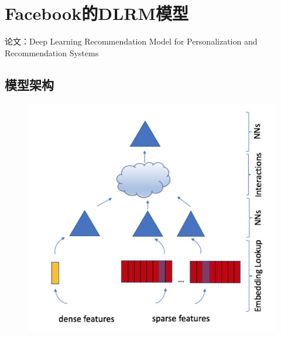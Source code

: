 \documentclass[12pt]{article}
\begin{document}
\section{Facebook的DLRM模型}
论文：Deep Learning Recommendation Model for Personalization and Recommendation Systems

\subsection{模型架构}
\begin{figure}[H]
    \centering
    \includegraphics[width=.6\textwidth]{fig/Facebook_DLRM_Structure.jpg}
\end{figure}
\end{document}
